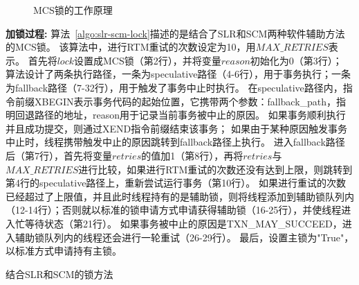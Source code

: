 \begin{figure}[htbp]
\centering
{}
\caption{MCS锁的工作原理}
\label{fig:mcs}
\end{figure}


\textbf{加锁过程:}
算法~\ref{algo:slr-scm-lock}描述的是结合了SLR和SCM两种软件辅助方法的MCS锁。
该算法中，进行RTM重试的次数设定为10，用$MAX\_RETRIES$表示。
首先将$lock$设置成MCS锁（第2行），并将变量$reason$初始化为0（第3行）；
算法设计了两条执行路径，一条为speculative路径（4-6行），用于事务执行；一条为fallback路径（7-32行），用于触发了事务中止时执行。
在speculative路径内，指令前缀XBEGIN表示事务代码的起始位置，它携带两个参数：fallback\_path，指明回退路径的地址，reason用于记录当前事务被中止的原因。
如果事务顺利执行并且成功提交，则通过XEND指令前缀结束该事务；
如果由于某种原因触发事务中止时，线程携带触发中止的原因跳转到fallback路径上执行。
进入fallback路径后（第7行），首先将变量$retries$的值加1（第8行），再将$retries$与$MAX\_RETRIES$进行比较，如果进行RTM重试的次数还没有达到上限，则跳转到第4行的speculative路径上，重新尝试运行事务（第10行）。
如果进行重试的次数已经超过了上限值，并且此时线程持有的是辅助锁，则将线程添加到辅助锁队列内（12-14行）；否则就以标准的锁申请方式申请获得辅助锁（16-25行），并使线程进入忙等待状态（第21行）。
如果事务被中止的原因是TXN\_MAY\_SUCCEED，进入辅助锁队列内的线程还会进行一轮重试（26-29行）。
最后，设置主锁为"True"，以标准方式申请持有主锁。


\begin{algorithm}[htbp]
\SetAlgoLined
{}
\caption{结合SLR和SCM的锁方法}
\label{algo:slr-scm-lock}
\end{algorithm}


